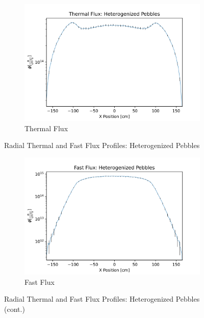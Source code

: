 \begin{figure}[H]
\centering

\begin{subfigure}{0.9\textwidth}
  \includegraphics[width=0.95\linewidth]{figures/therm_flux_het.png}
  \caption{Thermal Flux}
  \label{fig:het-det-xy-therm}
\end{subfigure}%

\caption{Radial Thermal and Fast Flux Profiles: Heterogenized Pebbles}
\end{figure}

\begin{figure}[H]\ContinuedFloat
\centering

\begin{subfigure}{0.9\textwidth}
  \includegraphics[width=0.95\linewidth]{figures/fast_flux_het.png}
  \caption{Fast Flux}
  \label{fig:het-det-xy-fast}
\end{subfigure}


\caption{Radial Thermal and Fast Flux Profiles: Heterogenized Pebbles (cont.)}
\label{fig:het-det-xy}
\end{figure}